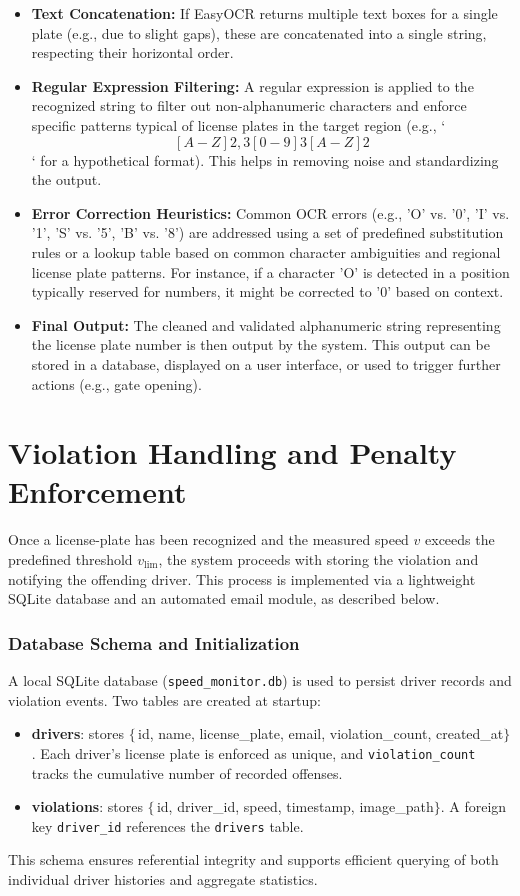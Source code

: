 \begin{itemize}
    \item \textbf{Text Concatenation:} If EasyOCR returns multiple text boxes for a single plate (e.g., due to slight gaps), these are concatenated into a single string, respecting their horizontal order.
    \item \textbf{Regular Expression Filtering:} A regular expression is applied to the recognized string to filter out non-alphanumeric characters and enforce specific patterns typical of license plates in the target region (e.g., `$$[A-Z]{2,3}[0-9]{3}[A-Z]{2}$$` for a hypothetical format). This helps in removing noise and standardizing the output.
    \item \textbf{Error Correction Heuristics:} Common OCR errors (e.g., 'O' vs. '0', 'I' vs. '1', 'S' vs. '5', 'B' vs. '8') are addressed using a set of predefined substitution rules or a lookup table based on common character ambiguities and regional license plate patterns. For instance, if a character 'O' is detected in a position typically reserved for numbers, it might be corrected to '0' based on context.
    \item \textbf{Final Output:} The cleaned and validated alphanumeric string representing the license plate number is then output by the system. This output can be stored in a database, displayed on a user interface, or used to trigger further actions (e.g., gate opening).
\end{itemize}




\section{ Violation Handling and Penalty Enforcement}

Once a license-plate has been recognized and the measured speed \(v\) exceeds the predefined threshold \(v_{\mathrm{lim}}\), the system proceeds with storing the violation and notifying the offending driver. This process is implemented via a lightweight SQLite database and an automated email module, as described below.

\subsubsection{Database Schema and Initialization}
A local SQLite database (\texttt{speed\_monitor.db}) is used to persist driver records and violation events. Two tables are created at startup:
\begin{itemize}
  \item \textbf{drivers}: stores  
    \(\{\)\,id, name, license\_plate, email, violation\_count, created\_at\(\}\).  
    Each driver’s license plate is enforced as unique, and \texttt{violation\_count} tracks the cumulative number of recorded offenses.
  \item \textbf{violations}: stores  
    \(\{\)\,id, driver\_id, speed, timestamp, image\_path\(\}\).  
    A foreign key \texttt{driver\_id} references the \texttt{drivers} table.
\end{itemize}
This schema ensures referential integrity and supports efficient querying of both individual driver histories and aggregate statistics.

